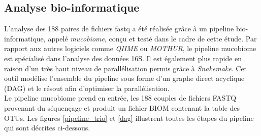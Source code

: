 \documentclass[12pt,a4paper]{article}
\begin{document}
\subsection{Analyse bio-informatique}
L’analyse des 188 paires de fichiers fastq a été réalisée grâce à un pipeline bio-informatique, appelé \textit{mucobiome}, conçu et testé dans le cadre de cette étude. Par rapport aux autres logiciels comme \textit{QIIME}\cite{Caporaso2010} ou \textit{MOTHUR}\cite{Schloss2009}, le pipeline mucobiome est spécialisé dans l’analyse des données 16S. Il est également plus rapide en raison d’un très haut niveau de parallélisation permis grâce à  \textit{Snakemake}\cite{Koster2012}. Cet outil modélise l'ensemble du pipeline sous forme d'un graphe direct acyclique (DAG) et le résout afin d'optimiser la parallélisation. \\
Le pipeline mucobiome prend en entrée, les 188 couples de fichiers FASTQ provenant du séquençage et produit un fichier BIOM contenant la table des OTUs. Les figures \ref{pipeline_trio} et \ref{dag} illustrent toutes les étapes du pipeline qui sont décrites ci-dessous.
\end{document}
